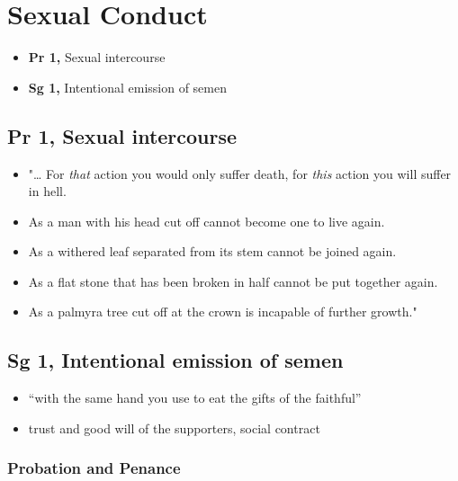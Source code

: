 \chapter{Sexual Conduct}

\begin{itemize}
\tightlist
\item
  \textbf{Pr 1,} Sexual intercourse
\item
  \textbf{Sg 1,} Intentional emission of semen
\end{itemize}

\section{Pr 1, Sexual intercourse}


\begin{itemize}
\tightlist
\item
  "\ldots{} For \emph{that} action you would only suffer death, for
  \emph{this} action you will suffer in hell.
\item
  As a man with his head cut off cannot become one to live again.
\item
  As a withered leaf separated from its stem cannot be joined again.
\item
  As a flat stone that has been broken in half cannot be put together
  again.
\item
  As a palmyra tree cut off at the crown is incapable of further
  growth."
\end{itemize}

\section{Sg 1, Intentional emission of semen}


\begin{itemize}
\tightlist
\item
  ``with the same hand you use to eat the gifts of the faithful''
\item
  trust and good will of the supporters, social contract
\end{itemize}

\subsection{Probation and Penance}


